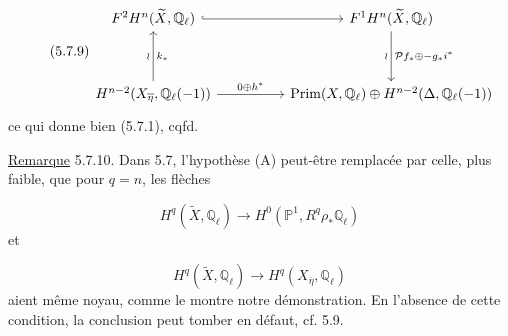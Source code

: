 \begin{equation}\tag{5.7.9}
\begin{tikzcd}[column sep=huge, row sep=huge]
F^2H^n(\widetilde{X},\mathbb{Q}_\ell) \arrow[r, hook] & F^1H^n(\widetilde{X},\mathbb{Q}_\ell) \arrow[d, "\wr"', "\mathcal{P}f_*\oplus -g_*i^*"] \\
H^{n-2}(X_{\overline{\eta}},\mathbb{Q}_\ell(-1)) \arrow[u, "\wr", "k_*"'] \arrow[r, "0 \oplus h^*"] & \mathrm{Prim}(X,\mathbb{Q}_\ell)\oplus H^{n-2}(\Delta,\mathbb{Q}_\ell(-1))
\end{tikzcd}
\end{equation}
ce qui donne bien (5.7.1), cqfd.



\underline{Remarque} 5.7.10. Dans 5.7, l'hypothèse (A) peut-être remplacée par celle, plus faible, que pour $q = n$, les flèches

\begin{equation}\tag{5.7.11}
H^q(\widetilde{X},\mathbb{Q}_\ell) \longrightarrow H^0(\mathbb{P}^1,R^q\rho_*\mathbb{Q}_\ell)
\end{equation}
et

\begin{equation}\tag{5.7.12}
H^q(\widetilde{X},\mathbb{Q}_\ell) \longrightarrow H^q(X_{\overline{\eta}},\mathbb{Q}_\ell)
\end{equation}
aient même noyau, comme le montre notre démonstration. En l'absence de cette condition, la conclusion peut tomber en défaut, cf. 5.9.


